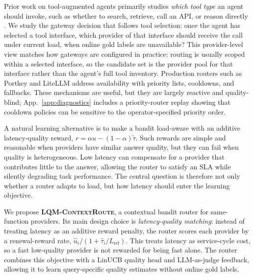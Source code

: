 \documentclass[11pt]{article}
\newcommand{\lqmcr}{\textsc{LQM-ContextRoute}}
\begin{document}
Prior work on tool-augmented agents primarily studies \emph{which tool type} an agent should invoke, such as whether to search, retrieve, call an API, or reason directly \citep{schick2023toolformer,patil2023gorilla,qin2023toolllm,yao2022react}. We study the gateway decision that follows tool selection: once the agent has selected a tool interface, which provider of that interface should receive the call under current load, when online gold labels are unavailable? This provider-level view matches how gateways are configured in practice: routing is usually scoped within a selected interface, so the candidate set is the provider pool for that interface rather than the agent's full tool inventory. Production routers such as Portkey \citep{portkey2026gateway} and LiteLLM \citep{litellm2026routing} address availability with priority lists, cooldowns, and fallbacks. These mechanisms are useful, but they are largely reactive and quality-blind; App.~\ref{app:diagnostics} includes a priority-router replay showing that cooldown policies can be sensitive to the operator-specified priority order.

A natural learning alternative is to make a bandit load-aware with an additive latency-quality reward, $r = \alpha u - (1{-}\alpha)\tilde{\tau}$. Such rewards are simple and reasonable when providers have similar answer quality, but they can fail when quality is heterogeneous. Low latency can compensate for a provider that contributes little to the answer, allowing the router to satisfy an SLA while silently degrading task performance. The central question is therefore not only whether a router adapts to load, but how latency should enter the learning objective.

We propose \textbf{\lqmcr{}}, a contextual bandit router for same-function providers. Its main design choice is \emph{latency-quality matching}: instead of treating latency as an additive reward penalty, the router scores each provider by a renewal-reward rate, $\hat{u}_i/(1+\hat{\tau}_i/L_{\text{ref}})$. This treats latency as service-cycle cost, so a fast low-quality provider is not rewarded for being fast alone. The router combines this objective with a LinUCB quality head and LLM-as-judge feedback, allowing it to learn query-specific quality estimates without online gold labels.
\end{document}
